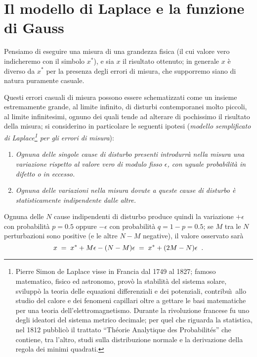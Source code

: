 
\chapter{Il modello di Laplace e la funzione di Gauss}%
%
\label{ch:d.applap}
Pensiamo di eseguire una misura di una grandezza fisica (il
cui valore vero indicheremo con il simbolo $x^*$), e sia $x$
il risultato ottenuto; in generale $x$ \`e diverso da $x^*$
per la presenza degli errori di misura, che supporremo siano
di natura puramente casuale.

%
Questi errori casuali di misura possono essere schematizzati
come un insieme estremamente grande, al limite infinito, di
disturbi contemporanei molto piccoli, al limite
infinitesimi, ognuno dei quali tende ad alterare di
pochissimo il risultato della misura; si considerino in
particolare le seguenti ipotesi (\emph{modello semplificato
  di Laplace\thinspace\footnote{Pierre Simon de Laplace
    visse in Francia dal 1749 al 1827; famoso matematico,
    fisico ed astronomo, prov\`o la stabilit\`a del sistema
    solare, svilupp\`o la teoria delle equazioni
    differenziali e dei potenziali, contribu\`\i\ allo
    studio del calore e dei fenomeni capillari oltre a
    gettare le basi matematiche per una teoria
    dell'elettromagnetismo.  Durante la rivoluzione francese
    fu uno degli ideatori del sistema metrico decimale; per
    quel che riguarda la statistica, nel 1812 pubblic\`o il
    trattato ``Th\'eorie Analytique des Probabilit\'es'' che
    contiene, tra l'altro, studi sulla distribuzione normale
    e la derivazione della regola dei minimi quadrati.}%
  per gli errori di misura}):
\begin{enumerate}
\item \textit{Ognuna delle singole cause di disturbo
    presenti introdurr\`a nella misura una variazione
    rispetto al valore vero di modulo fisso $\epsilon$, con
    uguale probabilit\`a in difetto o in eccesso.}
\item \textit{Ognuna delle variazioni nella misura dovute a
    queste cause di disturbo \`e statisticamente
    indipendente dalle altre.}
\end{enumerate}

Ognuna delle $N$ cause indipendenti di disturbo produce
quindi la variazione $+\epsilon$ con probabilit\`a $p = 0.5$
oppure $-\epsilon$ con probabilit\`a $q = 1-p = 0.5$; se $M$
tra le $N$ perturbazioni sono positive (e le altre $N-M$
negative), il valore osservato sar\`a
\begin{equation*}
  x \; = \;
    x^* + M \epsilon - (N-M) \epsilon \; = \;
    x^* + (2M-N) \epsilon \;\; .
\end{equation*}

